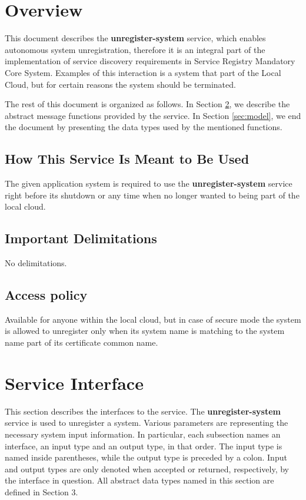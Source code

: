 \documentclass[a4paper]{arrowhead}
\begin{document}
\section{Overview}
\label{sec:overview}
This document describes the \textbf{unregister-system} service, which enables autonomous system unregistration, therefore it is an integral part of the implementation of service discovery requirements in Service Registry Mandatory Core System. Examples of this interaction is a system that part of the Local Cloud, but for certain reasons the system should be terminated.

The rest of this document is organized as follows.
In Section \ref{sec:functions}, we describe the abstract message functions provided by the service.
In Section \ref{sec:model}, we end the document by presenting the data types used by the mentioned functions.

\newpage

\subsection{How This Service Is Meant to Be Used}
The given application system is required to use the  \textbf{unregister-system} service right before its shutdown or any time when no longer wanted to being part of the local cloud.

\subsection{Important Delimitations}
\label{sec:delimitations}

No delimitations.

\subsection{Access policy}
\label{sec:accesspolicy}

Available for anyone within the local cloud, but in case of secure mode the system is allowed to unregister only 
when its system name is matching to the system name part of its certificate common name.

\newpage

\section{Service Interface}
\label{sec:functions}

This section describes the interfaces to the service. The \textbf{unregister-system} service is used to unregister a system. Various parameters are representing the necessary system input information.
In particular, each subsection names an interface, an input type and an output type, in that order.
The input type is named inside parentheses, while the output type is preceded by a colon.
Input and output types are only denoted when accepted or returned, respectively, by the interface in question. All abstract data types named in this section are defined in Section 3.
\end{document}
